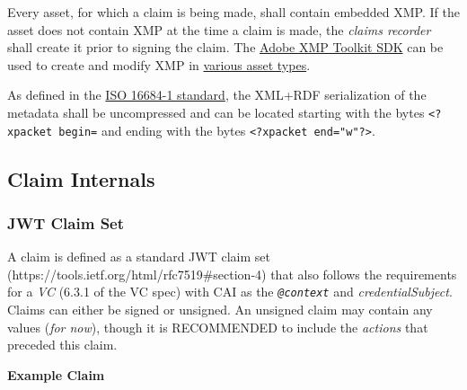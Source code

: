 \documentclass[
]{article}
\begin{document}
Every asset, for which a claim is being made, shall contain embedded
XMP. If the asset does not contain XMP at the time a claim is made, the
\emph{claims recorder} shall create it prior to signing the claim. The
\href{https://github.com/adobe/XMP-Toolkit-SDK/}{Adobe XMP Toolkit SDK}
can be used to create and modify XMP in
\href{https://github.com/adobe/XMP-Toolkit-SDK/tree/master/XMPFiles/source/FileHandlers}{various
asset types}.

As defined in the \href{https://www.iso.org/standard/75163.html}{ISO
16684-1 standard}, the XML+RDF serialization of the metadata shall be
uncompressed and can be located starting with the bytes
\texttt{\textless{}?xpacket\ begin=} and ending with the bytes
\texttt{\textless{}?xpacket\ end="w"?\textgreater{}}.

\hypertarget{claim-internals}{%
\subsection{Claim Internals}\label{claim-internals}}

\hypertarget{jwt-claim-set}{%
\subsubsection{JWT Claim Set}\label{jwt-claim-set}}

A claim is defined as a standard JWT claim set
(https://tools.ietf.org/html/rfc7519\#section-4) that also follows the
requirements for a \emph{VC} (6.3.1 of the VC spec) with CAI as the
\emph{\texttt{@context}} and \emph{credentialSubject}. Claims can either
be signed or unsigned. An unsigned claim may contain any values
(\emph{for now}), though it is RECOMMENDED to include the \emph{actions}
that preceded this claim.

\textbf{Example Claim}
\end{document}
